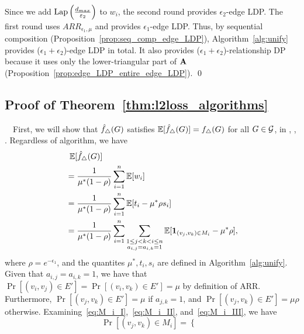{Since we add
$\textrm{Lap}\left(\frac{d_{max}}{\varepsilon_2}\right)$
to $w_i$, the second round provides $\epsilon_2$-edge LDP.
The first round uses $ARR_{\epsilon_1,\mu}$ and provides $\epsilon_1$-edge LDP.
Thus, by sequential composition (Proposition~\ref{prop:seq_comp_edge_LDP}),
Algorithm~\ref{alg:unify} provides ($\epsilon_1+\epsilon_2$)-edge LDP in total.
It also provides ($\epsilon_1+\epsilon_2$)-relationship DP because it uses only the lower-triangular part of $\mathbf{A}$ (Proposition~\ref{prop:edge_LDP_entire_edge_LDP}).
\qed

\subsection{Proof of Theorem~\ref{thm:l2loss_algorithms}}
\label{sub:prrof_l2loss_algorithms}
{}~~First, we will show that $\hat{f}_\triangle(G)$ satisfies
$\operatorname{\mathbb{E}}[\hat{f}_\triangle(G)] = f_\triangle(G)$ for all $G \in \mathcal{G}$, in \AlgOne{}, \AlgTwo{}, \AlgThree{}.
Regardless of algorithm, we have
\begin{align}
  &\;\operatorname{\mathbb{E}}[\hat{f}_\triangle(G)] \nonumber \\
  &= \frac{1}{\mu^*(1-\rho)}\sum_{i=1}^n \operatorname{\mathbb{E}}[w_i] \nonumber \\
  &= \frac{1}{\mu^*(1-\rho)}\sum_{i=1}^n \operatorname{\mathbb{E}}[t_i - \mu^* \rho s_i] \nonumber \\
  &= \frac{1}{\mu^*(1-\rho)}\sum_{i=1}^n \sum_{\substack{1 \leq j < k < i \leq n \\ a_{i,j} = a_{i,k} = 1}} \operatorname{\mathbb{E}}[\textbf{1}_{(v_j, v_k) \in M_i} - \mu^* \rho],
  \label{eq:unbias_1}
\end{align}
where $\rho = e^{-\epsilon_1}$, and the quantites $\mu^*, t_i, s_i$ are defined in
Algorithm~\ref{alg:unify}. Given that $a_{i,j} = a_{i,k} = 1$, we have that
$\Pr[(v_i, v_j) \in E'] = \Pr[(v_i, v_k) \in E'] = \mu$ by definition of ARR.
Furthermore,
$\Pr[(v_j, v_k) \in E'] = \mu$ if $a_{j,k} = 1$, and $\Pr[(v_j, v_k) \in E'] = \mu\rho$ otherwise.
Examining~\eqref{eq:M_i_I},~\eqref{eq:M_i_II}, and~\eqref{eq:M_i_III}, we have
\[
  \Pr[(v_j, v_k) \in M_i] =
  \begin{cases}

\end{cases}\]}
